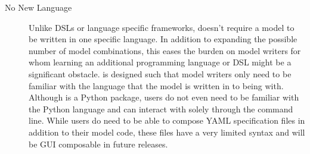 \documentclass[journal]{IEEEtran}
\newcommand{\todo}[1]{{\color{red}{#1}}}
\newcommand{\pkg}{{\tt \todo{cis\_interface}}{}}
\begin{document}
\begin{description}
	\item[No New Language] Unlike DSLs or language specific frameworks, {\pkg} doesn't require a model to be written in one specific language. In addition to expanding the possible number of model combinations, this eases the burden on model writers for whom learning an additional programming language or DSL might be a significant obstacle. {\pkg} is designed such that model writers only need to be familiar with the language that the model is written in to being with. Although {\pkg} is a Python package, users do not even need to be familiar with the Python language and can interact with {\pkg} solely through the command line. While users do need to be able to compose YAML specification files in addition to their model code, these files have a very limited syntax and will be GUI composable in future releases.
\end{description}
\end{document}
